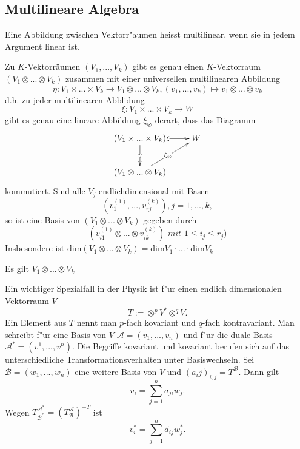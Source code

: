 \documentclass[11pt, a4paper]{article}
\begin{document}
\subsection{Multilineare Algebra}
\begin{definition}
Eine Abbildung zwischen Vektorr"aumen heisst multilinear, wenn sie in jedem Argument linear ist. 
\end{definition}
\begin{theorem}
Zu $K$-Vektorräumen $(V_1,...,V_k)$ gibt es genau einen $K$-Vektorraum $(V_1  \otimes ...  \otimes V_k)$ zusammen mit einer universellen multilinearen Abbildung 
$$
\eta : V_1 \times ... \times V_k  \rightarrow V_1\otimes ... \otimes V_k ,   (v_1,...,v_k) \mapsto v_1\otimes...\otimes v_k
$$
d.h. zu jeder multilinearen Abblidung
$$
\xi: V_1 \times ... \times V_k \rightarrow W
$$
gibt es genau eine lineare Abbildung $\xi_\otimes$ derart, dass das Diagramm 
\begin{gather*}
  \xymatrix{(V_1 \times ... \times V_k)  \ar[d]|{\eta} \ar[r]|{\xi} & W\\
    (V_1 \otimes ... \otimes V_k) \ar[ur]|{\xi_\otimes} & }
\end{gather*}
kommutiert. Sind alle $V_j$ endlichdimensional mit Basen 
$$
(v_1^{(1)},...,v_{rj}^{(k)}), j = 1,...,k,
$$
so ist eine Basis von $(V_1  \otimes ...  \otimes V_k)$ gegeben durch
$$
(v_{i1}^{(1)} \otimes...\otimes v_{ik}^{(k)}) \textit{ mit }  1 \leq i_j \leq r_j)
$$ 
Insbesondere ist $\mathrm{dim}(V_1\otimes...\otimes V_k) = \mathrm{dim} V_1\cdot ... \cdot \mathrm{dim}V_k$
\end{theorem}

\begin{remark}
Es gilt $V_1 \otimes ... \otimes V_k $%
\end{remark}

\begin{remark}
Ein wichtiger Spezialfall in der Physik ist f"ur einen endlich dimensionalen Vektorraum $V$
$$
T:= \otimes^p V^* \otimes^q V.
$$
Ein Element aus $T$ nennt man $p$-fach kovariant und $q$-fach kontravariant. Man schreibt f"ur eine Basis von $V$ $\mathcal{A} = (v_1, ..., v_n)$ und f"ur die duale Basis $\mathcal{A}^* = (v^1, ..., v^n)$.
Die Begriffe kovariant und kovariant berufen sich auf das unterschiedliche Transformationsverhalten unter Basiswechseln. Sei $\mathcal{B} = (w_1, ..., w_n)$ eine weitere Basis von $V$ und $(a_ij)_{i, j} = T^\mathcal{B}$. Dann gilt
$$
v_i =\sum\limits_{j = 1}^n a_{ji}w_j.
$$
Wegen $T^{\mathcal{A}^*}_{\mathcal{B}^*} = (T^{\mathcal{A}}_{\mathcal{B}})^{-T}$ ist 
$$
v_i^* =\sum\limits_{j = 1}^n \tilde{a_{ij}}w_j^*.
$$
\end{remark}
\end{document}
